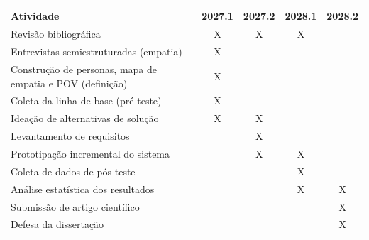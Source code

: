 \documentclass[
	12pt,				%
	oneside,			%
	a4paper,			%
	chapter=TITLE,		%
	section=TITLE,		%
	subsection=TITLE,	%
	subsubsection=TITLE,%
	english,			%
	french,				%
	spanish,			%
	brazilian,				%
	]{abntex2}
\begin{document}
\begin{quadro}
\caption{\label{quadro_cronograma}Cronograma de atividades}
\begin{tabular}{|p{7cm}|c|c|c|c|}
	\hline
  \textbf{Atividade} & \textbf{2027.1} & \textbf{2027.2} & \textbf{2028.1} & \textbf{2028.2} \\ \hline
	Revisão bibliográfica & X & X & X &  \\ \hline
	Entrevistas semiestruturadas (empatia) & X & & & \\ \hline
	Construção de personas, mapa de empatia e POV (definição) & X & & & \\ \hline
	Coleta da linha de base (pré-teste) & X & & & \\ \hline
	Ideação de alternativas de solução & X & X & & \\ \hline
	Levantamento de requisitos & & X & & \\ \hline
	Prototipação incremental do sistema & & X & X & \\ \hline
	Coleta de dados de pós-teste & & & X & \\ \hline
	Análise estatística dos resultados & & & X & X \\ \hline
  Submissão de artigo científico & & & & X \\ \hline
	Defesa da dissertação & & & & X \\ \hline
\end{tabular}
\end{quadro}

\cleardoublepage


\end{document}
